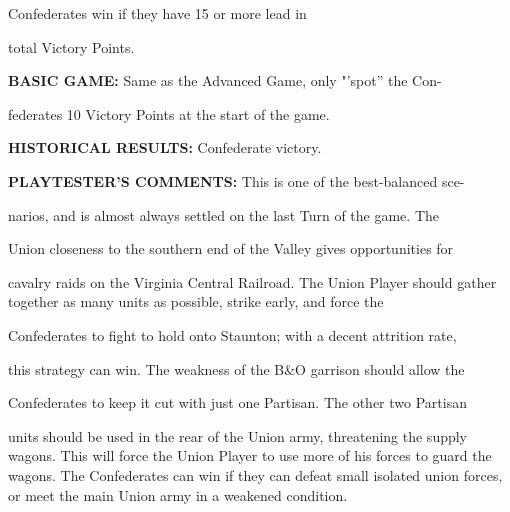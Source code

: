 \begin{scenariodata}
Confederates win if they have 15 or more lead in\\
\end{scenariodata}

total Victory Points.

\begin{scenariodata}
\textbf{BASIC GAME:} Same as the Advanced Game, only "'spot'' the Con-\\
\end{scenariodata}

federates 10 Victory Points at the start of the game.

\begin{scenariodata}
\textbf{HISTORICAL RESULTS:} Confederate victory.\\
\end{scenariodata}

\begin{scenariodata}
\textbf{PLAYTESTER'S COMMENTS:} This is one of the best-balanced sce-\\
\end{scenariodata}

narios, and is almost always settled on the last Turn of the game. The

\begin{scenariodata}
Union closeness to the southern end of the Valley gives opportunities for\\
\end{scenariodata}

cavalry raids on the Virginia Central Railroad. The Union Player should gather together as many units as possible, strike early, and force the

\begin{scenariodata}
Confederates to fight to hold onto Staunton; with a decent attrition rate,\\
\end{scenariodata}

this strategy can win. The weakness of the B\&O garrison should allow the

\begin{scenariodata}
Confederates to keep it cut with just one Partisan. The other two Partisan\\
\end{scenariodata}

units should be used in the rear of the Union army, threatening the supply wagons. This will force the Union Player to use more of his forces to guard the wagons. The Confederates can win if they can defeat small isolated union forces, or meet the main Union army in a weakened condition.

